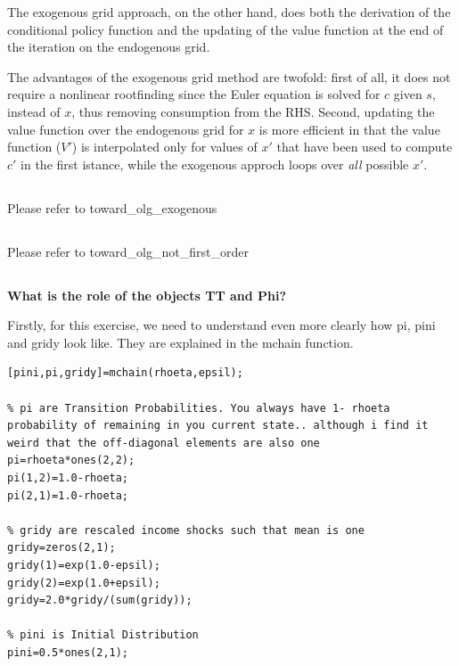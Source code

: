 \documentclass[12pt,a4paper]{article}
\begin{document}
The exogenous grid approach, on the other hand, does both the derivation of the conditional policy function and the updating of the value function at the end of the iteration on the endogenous grid.

The advantages of the exogenous grid method are twofold: first of all, it does not require a nonlinear rootfinding since the Euler equation is solved for $c$ given $s$, instead of $x$, thus removing consumption from the RHS. Second, updating the value function over the endogenous grid for $x$ is more efficient in that the value function ($V'$) is interpolated only for values of $x'$ that have been used to compute $c'$ in the first istance, while the exogenous approch loops over \textit{all} possible $x'$.

\subsection{}

Please refer to {\selectfont toward\_olg\_exogenous}

\subsection{}

Please refer to {\selectfont toward\_olg\_not\_first\_order}

\subsection{}

\textbf{What is the role of the objects TT and Phi?}

Firstly, for this exercise, we need to understand even more clearly how pi, pini and gridy look like. They are explained in the mchain function.

\begin{lstlisting}[frame=single]
[pini,pi,gridy]=mchain(rhoeta,epsil);

% pi are Transition Probabilities. You always have 1- rhoeta probability of remaining in you current state.. although i find it weird that the off-diagonal elements are also one
pi=rhoeta*ones(2,2);
pi(1,2)=1.0-rhoeta;
pi(2,1)=1.0-rhoeta;

% gridy are rescaled income shocks such that mean is one
gridy=zeros(2,1);
gridy(1)=exp(1.0-epsil);
gridy(2)=exp(1.0+epsil);
gridy=2.0*gridy/(sum(gridy));

% pini is Initial Distribution
pini=0.5*ones(2,1);
\end{lstlisting}
\end{document}
